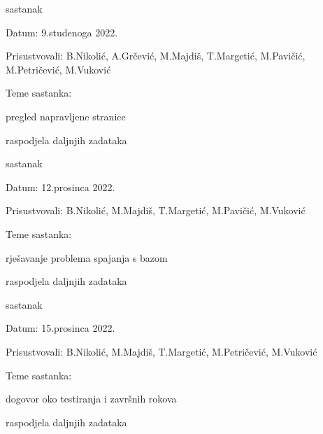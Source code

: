 \begin{packed_enum}
			
			\item sastanak
			
				\item[] \begin{packed_item}
					\item Datum: 9.studenoga 2022.
					\item Prisustvovali: B.Nikolić, A.Grčević, M.Majdiš, T.Margetić, M.Pavičić, M.Petričević, M.Vuković
					\item Teme sastanka:
					\begin{packed_item}
						\item pregled napravljene stranice
						\item raspodjela daljnjih zadataka
					\end{packed_item}
				\end{packed_item}
			
		
			\item sastanak
			
			\item[] \begin{packed_item}
				\item Datum: 12.prosinca 2022.
				\item Prisustvovali: B.Nikolić, M.Majdiš, T.Margetić, M.Pavičić, M.Vuković
				\item Teme sastanka:
				\begin{packed_item}
					\item rješavanje problema spajanja s bazom
					\item raspodjela daljnjih zadataka
				\end{packed_item}
			\end{packed_item}
		
			
			\item sastanak
			
			\item[] \begin{packed_item}
				\item Datum: 15.prosinca 2022.
				\item Prisustvovali: B.Nikolić, M.Majdiš, T.Margetić, M.Petričević, M.Vuković
				\item Teme sastanka:
				\begin{packed_item}
					\item dogovor oko testiranja i završnih rokova
					\item raspodjela daljnjih zadataka
				\end{packed_item}
			\end{packed_item}
		

\end{packed_enum}
